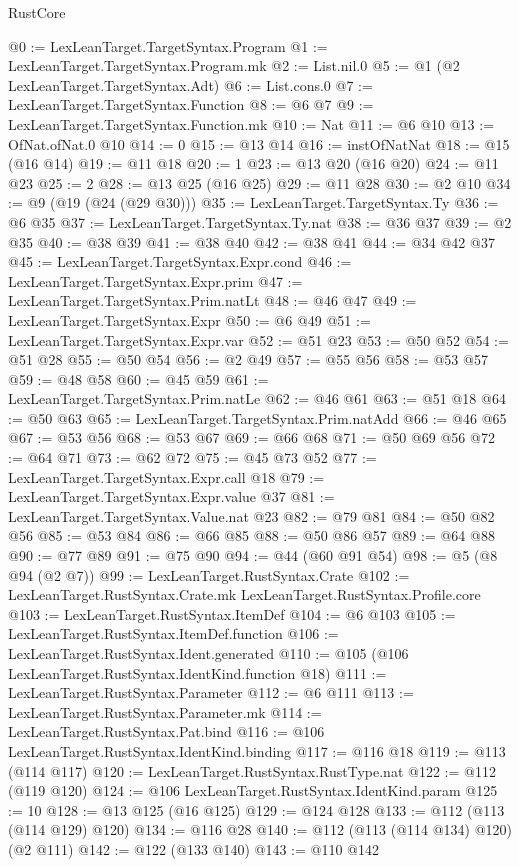 \begin{lexlean}{RustCore}
\begin{coremodule}
{\begin{coremodule}
{{{{{@0 := LexLeanTarget.TargetSyntax.Program
@1 := LexLeanTarget.TargetSyntax.Program.mk
@2 := List.nil.{0}
@5 := @1 (@2 LexLeanTarget.TargetSyntax.Adt)
@6 := List.cons.{0}
@7 := LexLeanTarget.TargetSyntax.Function
@8 := @6 @7
@9 := LexLeanTarget.TargetSyntax.Function.mk
@10 := Nat
@11 := @6 @10
@13 := OfNat.ofNat.{0} @10
@14 := 0
@15 := @13 @14
@16 := instOfNatNat
@18 := @15 (@16 @14)
@19 := @11 @18
@20 := 1
@23 := @13 @20 (@16 @20)
@24 := @11 @23
@25 := 2
@28 := @13 @25 (@16 @25)
@29 := @11 @28
@30 := @2 @10
@34 := @9 (@19 (@24 (@29 @30)))
@35 := LexLeanTarget.TargetSyntax.Ty
@36 := @6 @35
@37 := LexLeanTarget.TargetSyntax.Ty.nat
@38 := @36 @37
@39 := @2 @35
@40 := @38 @39
@41 := @38 @40
@42 := @38 @41
@44 := @34 @42 @37
@45 := LexLeanTarget.TargetSyntax.Expr.cond
@46 := LexLeanTarget.TargetSyntax.Expr.prim
@47 := LexLeanTarget.TargetSyntax.Prim.natLt
@48 := @46 @47
@49 := LexLeanTarget.TargetSyntax.Expr
@50 := @6 @49
@51 := LexLeanTarget.TargetSyntax.Expr.var
@52 := @51 @23
@53 := @50 @52
@54 := @51 @28
@55 := @50 @54
@56 := @2 @49
@57 := @55 @56
@58 := @53 @57
@59 := @48 @58
@60 := @45 @59
@61 := LexLeanTarget.TargetSyntax.Prim.natLe
@62 := @46 @61
@63 := @51 @18
@64 := @50 @63
@65 := LexLeanTarget.TargetSyntax.Prim.natAdd
@66 := @46 @65
@67 := @53 @56
@68 := @53 @67
@69 := @66 @68
@71 := @50 @69 @56
@72 := @64 @71
@73 := @62 @72
@75 := @45 @73 @52
@77 := LexLeanTarget.TargetSyntax.Expr.call @18
@79 := LexLeanTarget.TargetSyntax.Expr.value @37
@81 := LexLeanTarget.TargetSyntax.Value.nat @23
@82 := @79 @81
@84 := @50 @82 @56
@85 := @53 @84
@86 := @66 @85
@88 := @50 @86 @57
@89 := @64 @88
@90 := @77 @89
@91 := @75 @90
@94 := @44 (@60 @91 @54)
@98 := @5 (@8 @94 (@2 @7))
@99 := LexLeanTarget.RustSyntax.Crate
@102 := LexLeanTarget.RustSyntax.Crate.mk LexLeanTarget.RustSyntax.Profile.core
@103 := LexLeanTarget.RustSyntax.ItemDef
@104 := @6 @103
@105 := LexLeanTarget.RustSyntax.ItemDef.function
@106 := LexLeanTarget.RustSyntax.Ident.generated
@110 := @105 (@106 LexLeanTarget.RustSyntax.IdentKind.function @18)
@111 := LexLeanTarget.RustSyntax.Parameter
@112 := @6 @111
@113 := LexLeanTarget.RustSyntax.Parameter.mk
@114 := LexLeanTarget.RustSyntax.Pat.bind
@116 := @106 LexLeanTarget.RustSyntax.IdentKind.binding
@117 := @116 @18
@119 := @113 (@114 @117)
@120 := LexLeanTarget.RustSyntax.RustType.nat
@122 := @112 (@119 @120)
@124 := @106 LexLeanTarget.RustSyntax.IdentKind.param
@125 := 10
@128 := @13 @125 (@16 @125)
@129 := @124 @128
@133 := @112 (@113 (@114 @129) @120)
@134 := @116 @28
@140 := @112 (@113 (@114 @134) @120) (@2 @111)
@142 := @122 (@133 @140)
@143 := @110 @142
}}}}}
\end{coremodule}}
\end{coremodule}
\end{lexlean}
